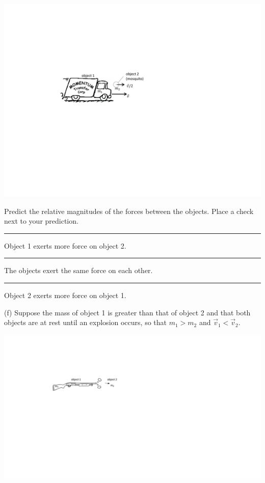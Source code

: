 {\par\centering \includegraphics{newtons_laws/truck_mosquito.pdf} \par}

\leftskip=1cm

Predict the relative magnitudes of the forces between the objects.
Place a check next to your prediction. 

\rule{0.5in}{0.1pt} Object 1 exerts more force on object 2. 

\rule{0.5in}{0.1pt} The objects exert the same force on each other. 

\rule{0.5in}{0.1pt} Object 2 exerts more force on object 1.

\leftskip=0cm

\bigskip

(f) Suppose the mass of object 1 is greater than that of object 2 and that both
objects are at rest until an explosion occurs, so that
$m_{1}>m_{2}$ and
${\vec  v}_1<{\vec  v}_2$.


{\par\centering \includegraphics{newtons_laws/rifle_bullet.pdf} \par}

